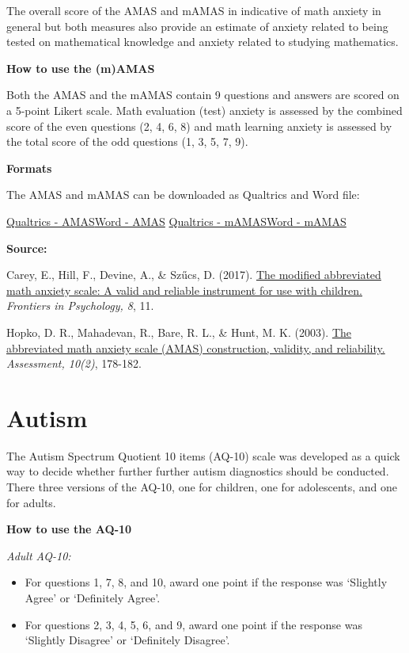\documentclass[
]{book}
\providecommand{\tightlist}{%
  \setlength{\itemsep}{0pt}\setlength{\parskip}{0pt}}
\begin{document}
The overall score of the AMAS and mAMAS in indicative of math anxiety in general but both measures also provide an estimate of anxiety related to being tested on mathematical knowledge and anxiety related to studying mathematics.

\textbf{How to use the (m)AMAS}

Both the AMAS and the mAMAS contain 9 questions and answers are scored on a 5-point Likert scale. Math evaluation (test) anxiety is assessed by the combined score of the even questions (2, 4, 6, 8) and math learning anxiety is assessed by the total score of the odd questions (1, 3, 5, 7, 9).

\textbf{Formats}

The AMAS and mAMAS can be downloaded as Qualtrics and Word file:

\href{link}{Qualtrics - AMAS}\textbar{}\href{link}{Word - AMAS}
\href{link}{Qualtrics - mAMAS}\textbar{}\href{link}{Word - mAMAS}

\textbf{Source:}

Carey, E., Hill, F., Devine, A., \& Szűcs, D. (2017). \href{https://www.frontiersin.org/articles/10.3389/fpsyg.2017.00011/full}{The modified abbreviated math anxiety scale: A valid and reliable instrument for use with children.} \emph{Frontiers in Psychology, 8}, 11.

Hopko, D. R., Mahadevan, R., Bare, R. L., \& Hunt, M. K. (2003). \href{https://www.researchgate.net/profile/Stephen_Joy/post/Hello_Can_anyone_tell_me_how_to_access_the_Abbreviated_Math_Anxiety_Scale_developed_by_Derek_Hopko2/attachment/59d624eb79197b80779833c8/AS:315374518636545@1452202552608/download/Math+Anxiety+Scale+Abbreviated+2003.pdf}{The abbreviated math anxiety scale (AMAS) construction, validity, and reliability.} \emph{Assessment, 10(2)}, 178-182.

\hypertarget{autism}{%
\section{Autism}\label{autism}}

The Autism Spectrum Quotient 10 items (AQ-10) scale was developed as a quick way to decide whether further further autism diagnostics should be conducted. There three versions of the AQ-10, one for children, one for adolescents, and one for adults.

\textbf{How to use the AQ-10}

\emph{Adult AQ-10:}

\begin{itemize}
\tightlist
\item
  For questions 1, 7, 8, and 10, award one point if the response was `Slightly Agree' or `Definitely Agree'.
\item
  For questions 2, 3, 4, 5, 6, and 9, award one point if the response was `Slightly Disagree' or `Definitely Disagree'.
\end{itemize}
\end{document}
